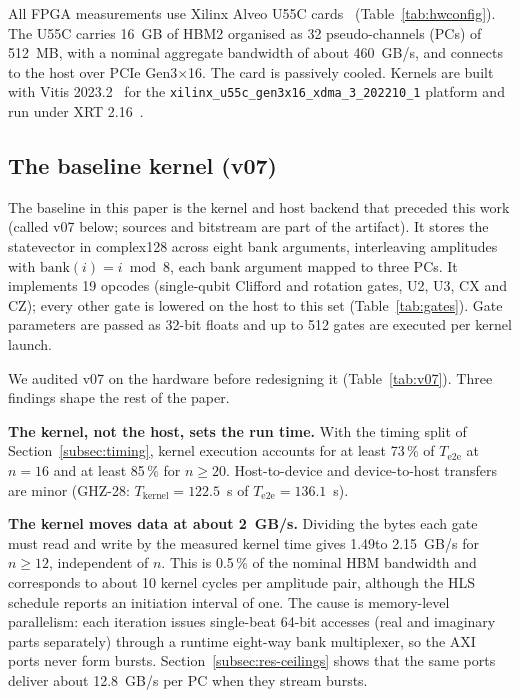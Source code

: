 \documentclass[pdflatex,sn-mathphys-num]{sn-jnl}
\newcommand{\NumHbmSixteenPerCURead}{12.8}
\newcommand{\NumVsevenBwFracPct}{0.5}
\newcommand{\NumVsevenBwMax}{2.15}
\newcommand{\NumVsevenBwMin}{1.49}
\newcommand{\NumVsevenCyclesPerPair}{10}
\newcommand{\NumVsevenGhzTwentyEightEtoE}{136.1}
\newcommand{\NumVsevenGhzTwentyEightKernel}{122.5}
\newcommand{\NumVsevenKernelFracMin}{73}
\newcommand{\NumVsevenKernelFracMinTwenty}{85}
\newcommand{\NumVsevenOpcodes}{19}
\theoremstyle{thmstyleone}
\theoremstyle{thmstylethree}
\begin{document}
All FPGA measurements use Xilinx Alveo U55C cards~\cite{xilinx2023alveo} (Table~\ref{tab:hwconfig}). The U55C carries 16~GB of HBM2 organised as 32 pseudo-channels (PCs) of 512~MB, with a nominal aggregate bandwidth of about 460~GB/s, and connects to the host over PCIe Gen3$\times$16. The card is passively cooled. Kernels are built with Vitis 2023.2~\cite{vitis2023hls} for the \texttt{xilinx\_u55c\_gen3x16\_xdma\_3\_202210\_1} platform and run under XRT 2.16~\cite{xrt2023}.

\subsection{The baseline kernel (v07)}\label{subsec:v07}

The baseline in this paper is the kernel and host backend that preceded this work (called v07 below; sources and bitstream are part of the artifact). It stores the statevector in complex128 across eight bank arguments, interleaving amplitudes with $\text{bank}(i) = i \bmod 8$, each bank argument mapped to three PCs. It implements \NumVsevenOpcodes{} opcodes (single-qubit Clifford and rotation gates, U2, U3, CX and CZ); every other gate is lowered on the host to this set (Table~\ref{tab:gates}). Gate parameters are passed as 32-bit floats and up to 512 gates are executed per kernel launch.

We audited v07 on the hardware before redesigning it (Table~\ref{tab:v07}). Three findings shape the rest of the paper.

\textbf{The kernel, not the host, sets the run time.} With the timing split of Section~\ref{subsec:timing}, kernel execution accounts for at least \NumVsevenKernelFracMin\,\% of $T_\mathrm{e2e}$ at $n=16$ and at least \NumVsevenKernelFracMinTwenty\,\% for $n\geq 20$. Host-to-device and device-to-host transfers are minor (GHZ-28: $T_\mathrm{kernel}=\NumVsevenGhzTwentyEightKernel$~s of $T_\mathrm{e2e}=\NumVsevenGhzTwentyEightEtoE$~s).

\textbf{The kernel moves data at about 2~GB/s.} Dividing the bytes each gate must read and write by the measured kernel time gives \NumVsevenBwMin to \NumVsevenBwMax~GB/s for $n\geq 12$, independent of $n$. This is \NumVsevenBwFracPct\,\% of the nominal HBM bandwidth and corresponds to about \NumVsevenCyclesPerPair{} kernel cycles per amplitude pair, although the HLS schedule reports an initiation interval of one. The cause is memory-level parallelism: each iteration issues single-beat 64-bit accesses (real and imaginary parts separately) through a runtime eight-way bank multiplexer, so the AXI ports never form bursts. Section~\ref{subsec:res-ceilings} shows that the same ports deliver about \NumHbmSixteenPerCURead~GB/s per PC when they stream bursts.
\end{document}
